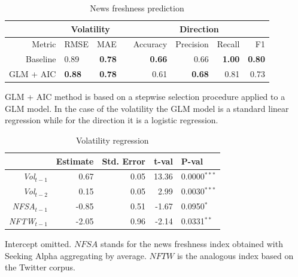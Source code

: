 \documentclass[a4paper, 12pt]{report}
\begin{document}
    \begin{table}[ht]
    \centering
    \begin{threeparttable}
    \begin{tabular}{rlrrrrrr} 
    &
    \multicolumn{2}{c}{\textbf{Volatility}} & & \multicolumn{4}{c}{\textbf{Direction}}\\
      \toprule
     Metric & RMSE & MAE &  &Accuracy & Precision & Recall & F1  \\ 
      \midrule
    Baseline & 0.89 & \textbf{0.78}& & \textbf{0.66} & 0.66 & \textbf{1.00} & \textbf{0.80}\\ 
    GLM + AIC & \textbf{0.88} & \textbf{0.78} & & 0.61 & \textbf{0.68} & 0.81 & 0.73\\ 
       \bottomrule
    \end{tabular}
    \begin{tablenotes}
      \footnotesize
      \item GLM + AIC method is based on a stepwise selection procedure applied to a GLM model. In the case of the volatility the GLM model is a standard linear regression while for the direction it is a logistic regression. 
    \end{tablenotes}
    \caption{News freshness prediction}
    \label{Tab:Freshness}
  \end{threeparttable}
    \end{table}
    
\begin{table}
\centering
  \begin{threeparttable}
     \begin{tabular}{rrrrl}
     & \textbf{Estimate} & \textbf{Std. Error} & \textbf{t-val} & \textbf{P-val} \\ 
      \midrule
      \textit{Vol$_{t-1}$} & 0.67 & 0.05 & 13.36 & 0.0000$^{***}$ \\ 
      \textit{Vol$_{t-2}$} & 0.15 & 0.05 & 2.99 & 0.0030$^{***}$ \\ 
      \textit{NFSA$_{t-1}$} & -0.85 & 0.51 & -1.67 & 0.0950$^{*}$ \\
    \textit{NFTW$_{t-1}$}  & -2.05 & 0.96 & -2.14 & 0.0331$^{**}$ \\ 
       \bottomrule
    \end{tabular}
    \begin{tablenotes}
      \footnotesize
      \item Intercept omitted. $NFSA$ stands for the news freshness index obtained with Seeking Alpha aggregating by average. $NFTW$ is the analogous index based on the Twitter corpus.
    \end{tablenotes}
    \caption{Volatility regression}
    \label{Tab:FreshnessVol}
  \end{threeparttable}
\end{table}
\end{document}

